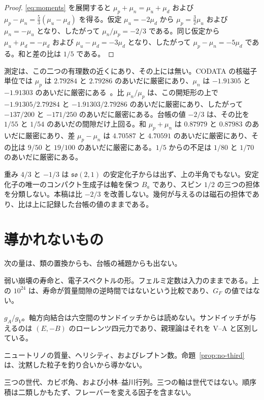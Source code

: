 \documentclass[a4paper]{article}
\begin{document}
\begin{proof}
\eqref{eq:moments} を展開すると \(\mu_p+\mu_n=\mu_u+\mu_d\) および \(\mu_p-\mu_n=\tfrac53(\mu_u-\mu_d)\) を得る。仮定 \(\mu_u=-2\mu_d\) から \(\mu_p=\tfrac32\mu_u\) および \(\mu_n=-\mu_u\) となり、したがって \(\mu_n/\mu_p=-2/3\) である。同じ仮定から \(\mu_u+\mu_d=-\mu_d\) および \(\mu_u-\mu_d=-3\mu_d\) となり、したがって \(\mu_p-\mu_n=-5\mu_d\) である。和と差の比は \(1/5\) である。
\end{proof}

測定は、この二つの有理数の近くにあり、その上には無い。CODATA の核磁子単位では \(\mu_p\) は \(2.79284\) と \(2.79286\) のあいだに厳密にあり、\(\mu_n\) は \(-1.91305\) と \(-1.91303\) のあいだに厳密にある~\cite{codata2018}。比 \(\mu_n/\mu_p\) は、この開矩形の上で \(-1.91305/2.79284\) と \(-1.91303/2.79286\) のあいだに厳密にあり、したがって \(-137/200\) と \(-171/250\) のあいだに厳密にある。台帳の値 \(-2/3\) は、その比を \(1/55\) と \(1/54\) のあいだの間隙だけ上回る。和 \(\mu_p+\mu_n\) は \(0.87979\) と \(0.87983\) のあいだに厳密にあり、差 \(\mu_p-\mu_n\) は \(4.70587\) と \(4.70591\) のあいだに厳密にあり、その比は \(9/50\) と \(19/100\) のあいだに厳密にある。\(1/5\) からの不足は \(1/80\) と \(1/70\) のあいだに厳密にある。

重み \(4/3\) と \(-1/3\) は \(\mathfrak{so}(2,1)\) の安定化子からは出ず、上の半角でもない。安定化子の唯一のコンパクト生成子は軸を保つ \(B_a\) であり、スピン \(1/2\) の三つの担体を分類しない。本稿は比 \(-2/3\) を改善しない。幾何が与えるのは磁石の担体であり、比は上に記録した台帳の値のままである。

\section{導かれないもの}
\label{sec:open}

次の量は、類の置換からも、台帳の補題からも出ない。

弱い崩壊の寿命と、電子スペクトルの形。フェルミ定数は入力のままである。上の \(10^{24}\) は、寿命が質量間隙の逆時間ではないという比較であり、\(G_F\) の値ではない。

\(g_A/g_V\)。軸方向結合は六空間のサンドイッチからは読めない。サンドイッチが与えるのは \((E,-B)\) のローレンツ四元力であり、親理論はそれを V--A と区別している。

ニュートリノの質量、ヘリシティ、およびレプトン数。命題~\ref{prop:no-third} は、沈黙した粒子を釣り合いから導かない。

三つの世代、カビボ角、および小林--益川行列。三つの軸は世代ではない。順序積は二類しかもたず、フレーバーを変える因子を含まない。
\end{document}
